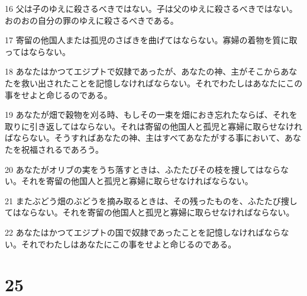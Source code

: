 \par 16 父は子のゆえに殺さるべきではない。子は父のゆえに殺さるべきではない。おのおの自分の罪のゆえに殺さるべきである。
\par 17 寄留の他国人または孤児のさばきを曲げてはならない。寡婦の着物を質に取ってはならない。
\par 18 あなたはかつてエジプトで奴隷であったが、あなたの神、主がそこからあなたを救い出されたことを記憶しなければならない。それでわたしはあなたにこの事をせよと命じるのである。
\par 19 あなたが畑で穀物を刈る時、もしその一束を畑におき忘れたならば、それを取りに引き返してはならない。それは寄留の他国人と孤児と寡婦に取らせなければならない。そうすればあなたの神、主はすべてあなたがする事において、あなたを祝福されるであろう。
\par 20 あなたがオリブの実をうち落すときは、ふたたびその枝を捜してはならない。それを寄留の他国人と孤児と寡婦に取らせなければならない。
\par 21 またぶどう畑のぶどうを摘み取るときは、その残ったものを、ふたたび捜してはならない。それを寄留の他国人と孤児と寡婦に取らせなければならない。
\par 22 あなたはかつてエジプトの国で奴隷であったことを記憶しなければならない。それでわたしはあなたにこの事をせよと命じるのである。

\chapter{25}

